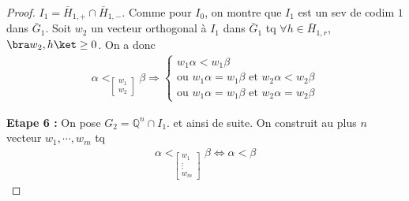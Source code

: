 \begin{proof}
            $I_1 = \bar H_{1,+} \cap \bar H_{1,-}$. Comme pour $I_0$, on montre que $I_1$ est un sev de codim $1$ dans $\bar G_1$. Soit $w_2$ un vecteur orthogonal à $I_1$ dans $\bar G_1$ tq $\forall h \in \bar H_{1,r}$, $\bra w_2, h \ket \geq 0$. On a donc
            \begin{align*}
                \alpha <_{\begin{bmatrix} w_1 \\ w_2 \end{bmatrix}} \beta \Rightarrow
                \begin{cases}
                    w_1\alpha < w_1 \beta \\
                    \text{ou } w_1\alpha = w_1 \beta \text{ et } w_2 \alpha < w_2 \beta \\
                    \text{ou } w_1 \alpha = w_1 \beta \text{ et } w_2 \alpha = w_2 \beta
                \end{cases}
            \end{align*}
            \item \textbf{Etape 6 :} On pose $G_2 = \mathbb{Q}^n \cap I_1$. et ainsi de suite. On construit au plus $n$ vecteur $w_1, \cdots, w_m$ tq
            \begin{align*}
                \alpha <_{\begin{bmatrix} w_1 \\ \vdots \\ w_m \end{bmatrix}} \beta \iff \alpha < \beta
            \end{align*}
        \end{proof}

